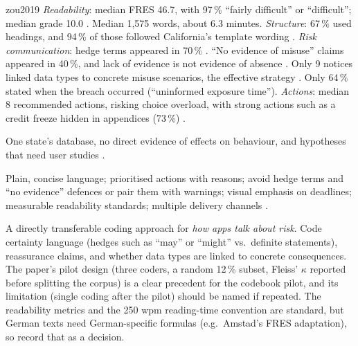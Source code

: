 \begin{papercard}{zou2019}
 \emph{Readability}: median FRES 46.7, with 97\,\% ``fairly difficult'' or ``difficult''; median grade 10.0 . Median 1,575 words, about 6.3 minutes. \emph{Structure}: 67\,\% used headings, and 94\,\% of those followed California's template wording . \emph{Risk communication}: hedge terms appeared in 70\,\% . ``No evidence of misuse'' claims appeared in 40\,\%, and lack of evidence is not evidence of absence . Only 9 notices linked data types to concrete misuse scenarios, the effective strategy . Only 64\,\% stated when the breach occurred (``uninformed exposure time''). \emph{Actions}: median 8 recommended actions, risking choice overload, with strong actions such as a credit freeze hidden in appendices (73\,\%) .

 One state's database, no direct evidence of effects on behaviour, and hypotheses that need user studies .

 Plain, concise language; prioritised actions with reasons; avoid hedge terms and ``no evidence'' defences or pair them with warnings; visual emphasis on deadlines; measurable readability standards; multiple delivery channels .

 A directly transferable coding approach for \emph{how apps talk about risk}. Code certainty language (hedges such as ``may'' or ``might'' vs.\ definite statements), reassurance claims, and whether data types are linked to concrete consequences. The paper's pilot design (three coders, a random 12\,\% subset, Fleiss' $\kappa$ reported before splitting the corpus) is a clear precedent for the codebook pilot, and its limitation (single coding after the pilot) should be named if repeated. The readability metrics and the 250 wpm reading-time convention are standard, but German texts need German-specific formulas (e.g.\ Amstad's FRES adaptation), so record that as a decision.
\end{papercard}
